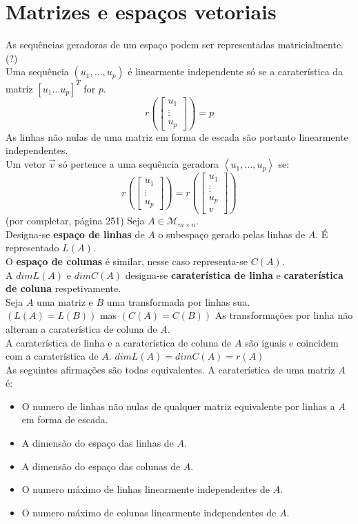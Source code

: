 \documentclass[]{report}
\begin{document}
\section{Matrizes e espaços vetoriais}
As sequências geradoras de um espaço podem ser representadas matricialmente. (?)\\
Uma sequência $(u_1, \dots, u_p)$ é linearmente independente só se a caraterística da matriz $[u_1 \dots u_p]^T$ for $p$.
$$r \left( \begin{bmatrix}
u_1 \\ \vdots \\ u_p
\end{bmatrix} \right)
= p$$
As linhas não nulas de uma matriz em forma de escada são portanto linearmente independentes.\\
Um vetor $\vec v$ só pertence a uma sequência geradora $\left\langle u_1, \dots, u_p \right\rangle$ se:
$$r \left( \begin{bmatrix}
u_1 \\ \vdots \\ u_p
\end{bmatrix} \right)
= r \left( \begin{bmatrix}
u_1 \\ \vdots \\ u_p \\ v
\end{bmatrix} \right)$$
(por completar, página 251)
\vspace{5mm}
Seja $A \in \mathcal{M}_{m \times n}$.\\
Designa-se \textbf{espaço de linhas} de $A$ o subespaço gerado pelas linhas de $A$. É representado $L(A)$.\\
O \textbf{espaço de colunas} é similar, nesse caso representa-se $C(A)$.\\
A $dim L(A)$ e $dim C(A)$ designa-se \textbf{caraterística de linha} e \textbf{caraterística de coluna} respetivamente.\\[2mm]
Seja $A$ uma matriz e $B$ uma transformada por linhas sua.\\
$(L(A) = L(B))$ mas $(C(A) = C(B))$
As transformações por linha não alteram a caraterística de coluna de $A$.\\
A caraterística de linha e a caraterística de coluna de $A$ são iguais e coincidem com a caraterística de $A$.
$dim L(A) = dim C(A) = r(A)$\\
As seguintes afirmações são todas equivalentes. A caraterística de uma matriz $A$ é:
\begin{itemize}
\item O numero de linhas não nulas de qualquer matriz equivalente por linhas a $A$ em forma de escada.
\item A dimensão do espaço das linhas de $A$.
\item A dimensão do espaço das colunas de $A$.
\item O numero máximo de linhas linearmente independentes de $A$.
\item O numero máximo de colunas linearmente independentes de $A$.
\end{itemize}
\end{document}
